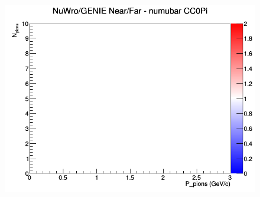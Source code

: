 \documentclass[12pt]{article}
\begin{document}
\begin{figure}[h]
\endminipage
{}
\includegraphics[width=\linewidth]{N_P/nominal/pions/ratios/CC0Pi_NuWro_GENIE_numubar_NF_N_P.png}
\endminipage
\newline
\end{figure}
\clearpage
\end{document}
